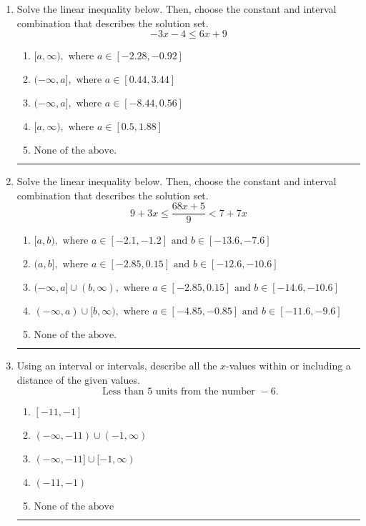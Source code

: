 \documentclass[14pt]{extbook}
\newcommand{\litem}[1]{\item#1\hspace*{-1cm}\rule{\textwidth}{0.4pt}}
\begin{document}
\begin{enumerate}
{\begin{enumerate}[label=\Alph*.]
\end{enumerate} }
\litem{
Solve the linear inequality below. Then, choose the constant and interval combination that describes the solution set.\[ -3x -4 \leq 6x + 9 \]\begin{enumerate}[label=\Alph*.]
\item \( [a, \infty), \text{ where } a \in [-2.28, -0.92] \)
\item \( (-\infty, a], \text{ where } a \in [0.44, 3.44] \)
\item \( (-\infty, a], \text{ where } a \in [-8.44, 0.56] \)
\item \( [a, \infty), \text{ where } a \in [0.5, 1.88] \)
\item \( \text{None of the above}. \)

\end{enumerate} }
\litem{
Solve the linear inequality below. Then, choose the constant and interval combination that describes the solution set.\[ 9 + 3 x \leq \frac{68 x + 5}{9} < 7 + 7 x \]\begin{enumerate}[label=\Alph*.]
\item \( [a, b), \text{ where } a \in [-2.1, -1.2] \text{ and } b \in [-13.6, -7.6] \)
\item \( (a, b], \text{ where } a \in [-2.85, 0.15] \text{ and } b \in [-12.6, -10.6] \)
\item \( (-\infty, a] \cup (b, \infty), \text{ where } a \in [-2.85, 0.15] \text{ and } b \in [-14.6, -10.6] \)
\item \( (-\infty, a) \cup [b, \infty), \text{ where } a \in [-4.85, -0.85] \text{ and } b \in [-11.6, -9.6] \)
\item \( \text{None of the above.} \)

\end{enumerate} }
\litem{
Using an interval or intervals, describe all the $x$-values within or including a distance of the given values.\[ \text{ Less than } 5 \text{ units from the number } -6. \]\begin{enumerate}[label=\Alph*.]
\item \( [-11, -1] \)
\item \( (-\infty, -11) \cup (-1, \infty) \)
\item \( (-\infty, -11] \cup [-1, \infty) \)
\item \( (-11, -1) \)
\item \( \text{None of the above} \)

\end{enumerate} }
\end{enumerate}
\end{document}
